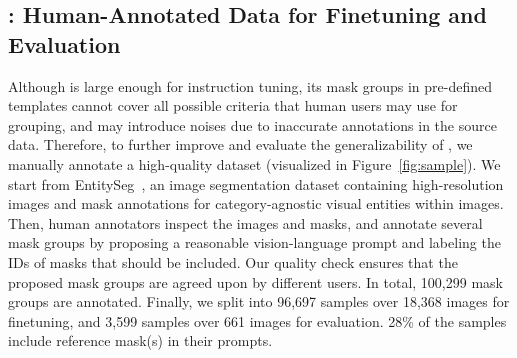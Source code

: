 \subsection{\ourgooddata: Human-Annotated Data for Finetuning and Evaluation}
Although \ourlargedata is large enough for instruction tuning, its mask groups in pre-defined templates cannot cover all possible criteria that human users may use for grouping, and may introduce noises due to inaccurate annotations in the source data. Therefore, to further improve and evaluate the generalizability of \ourmodel, we manually annotate a high-quality dataset \ourgooddata (visualized in Figure~\ref{fig:sample}). We start from EntitySeg~\cite{qi2023high}, an image segmentation dataset containing high-resolution images and mask annotations for category-agnostic visual entities within images. Then, human annotators inspect the images and masks, and annotate several mask groups by proposing a reasonable vision-language prompt and labeling the IDs of masks that should be included. Our quality check ensures that the proposed mask groups are agreed upon by different users. In total, 100,299 mask groups are annotated. Finally, we split \ourgooddata into 96,697 samples over 18,368 images for finetuning, and 3,599 samples over 661 images for evaluation. 28\% of the samples include reference mask(s) in their prompts.
